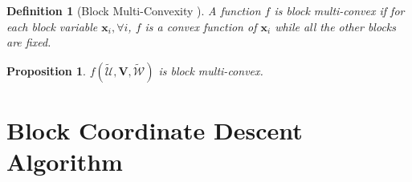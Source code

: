 \documentclass{article}
\makeatletter
\def\eg{\emph{e.g. }}
\newcommand*{\rom}[1]{\expandafter\@slowromancap\romannumeral #1@}
\newtheorem{prop}{Proposition}
\newtheorem{defi}{Definition}
\makeatother
\begin{document}
    \begin{defi}[Block Multi-Convexity \cite{xu2013block}]\label{def:bmc}
    A function $f$ is {\em block multi-convex} if for each block variable $\mathbf{x}_i, \forall i$, $f$ is a convex function of $\mathbf{x}_i$ while all the other blocks are fixed.
    \end{defi}
    
    \begin{prop}\label{lem:multi-convex}
    $f(\tilde{\mathcal{U}}, \mathbf{V}, \tilde{\mathcal{W}})$ is block multi-convex.
    \end{prop}
    
    
    


	
	
	\section{Block Coordinate Descent Algorithm}\label{sec:BCD}
\end{document}
